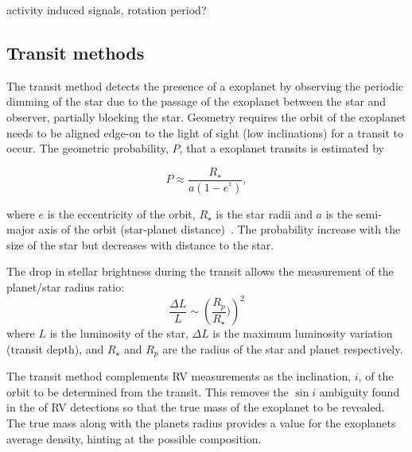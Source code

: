 activity induced signals, rotation period?

\subsection{Transit methods}
The transit method detects the presence of a exoplanet by observing the periodic dimming of the star due to the passage of the exoplanet between the star and observer, partially blocking the star.
Geometry requires the orbit of the exoplanet needs to be aligned edge-on to the light of sight (low inclinations) for a transit to occur.
The geometric probability, $P$, that a exoplanet transits is estimated by 

\begin{equation}
P \approx \frac{R_{\star}}{a(1-e^^2)},
\end{equation}

where \(e\) is the eccentricity of the orbit, $R_{\star}$ is the star radii and \(a\) is the semi-major axis of the orbit (star-planet distance)~\citep{barnes_effects_2007}.
The probability increase with the size of the star but decreases with distance to the star.

The drop in stellar brightness during the transit allows the measurement of the planet/star radius ratio:
\begin{equation}
    \frac{\Delta L}{L} \sim \left(\frac{R_p}{R_{\star}})\right)^2
\end{equation}
where \(L\) is the luminosity of the star, \(\Delta L\) is the maximum luminosity variation (transit depth), and \(R_{\star}\) and \(R_p\) are the radius of the star and planet respectively.

The transit method complements RV measurements as the inclination, $i$, of the orbit to be determined from the transit. This removes the {$\sin{i}$} ambiguity found in the \msini of RV detections so that the true mass of the exoplanet to be revealed. The true mass along with the planets radius provides a value for the exoplanets average density, hinting at the possible composition.

